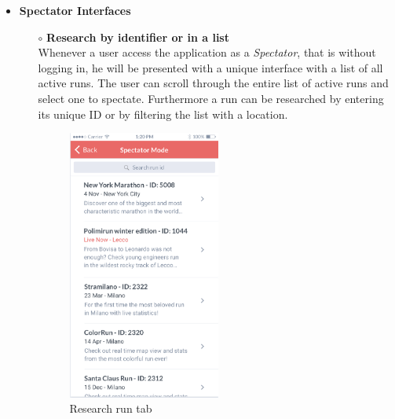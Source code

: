 \documentclass[titlepage]{article}
\begin{document}
\begin{itemize}
\begin{itemize}
\begin{itemize}
				\end{itemize}
				\item{\bf Spectator Interfaces} 
				\begin{itemize}
					\item[$\circ$] {\bf Research by identifier or in a list} \\
					Whenever a user access the application as a {\it Spectator}, that is without logging in, he will be presented with a unique interface with a list of all active runs. The user can scroll through the entire list of active runs and select one to spectate. Furthermore a run can be researched by entering its unique ID or by filtering the list with a location.\\
					\begin{figure}[H]
						\center
  						\includegraphics[width=5cm]{Mockup/mockupResearch.png}
  						\caption{Research run tab}
 					 	\label{fig:Research}
					\end{figure}


\end{itemize}
\end{itemize}
\end{itemize}
\end{document}
